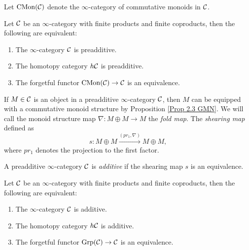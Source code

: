 Let $\operatorname{CMon}({\mathcal{C}})$ \cite[Definition 2.4.2.1.]{HA} denote the $\infty$-category of commutative monoids in ${\mathcal{C}}$.
\begin{proposition}
\label{Prop 2.3 GMN}
\cite[Proposition 2.3]{Gepner-Moritz-Nikolaus}
Let ${\mathcal{C}}$ be an $\infty$-category with finite products and finite coproducts, 
    then the following are equivalent:
    \begin{enumerate}
        \item The $\infty$-category ${\mathcal{C}}$ is preadditive.
        \item The homotopy category $h{\mathcal{C}}$ is preadditive.
        \item The forgetful functor $\operatorname{CMon}({\mathcal{C}}) \to {\mathcal{C}}$ is an equivalence.
    \end{enumerate}
\end{proposition}




If $M\in {\mathcal{C}}$ is an object in a preadditive $\infty$-category ${\mathcal{C}}$, then $M$ can be equipped with a commutative monoid structure by Proposition \ref{Prop 2.3 GMN}.
We will call the monoid structure map $\nabla:M\oplus M \to M$ the \emph{fold map}. 
The \emph{shearing map} defined as
$$
s: M\oplus M \xrightarrow{(pr_1, \nabla)} M\oplus M,
$$
where $pr_1$ denotes the projection to the first factor.

\begin{definition}
\cite[Definition 2.6]{Gepner-Moritz-Nikolaus}
    \label{additive}
    A preadditive $\infty$-category ${\mathcal{C}}$ is \emph{additive} if the shearing map $s$ is an equivalence.
\end{definition}

\begin{proposition}
\label{Prop 2.8 GMN}
\cite[Proposition 2.8]{Gepner-Moritz-Nikolaus}
Let ${\mathcal{C}}$ be an $\infty$-category with finite products and finite coproducts, 
    then the following are equivalent:
    \begin{enumerate}
      \item The $\infty$-category ${\mathcal{C}}$ is additive.
      \item The homotopy category $h{\mathcal{C}}$ is additive.
      \item The forgetful functor $\operatorname{Grp}({\mathcal{C}})\to {\mathcal{C}}$ is an equivalence.
    \end{enumerate}
\end{proposition}

